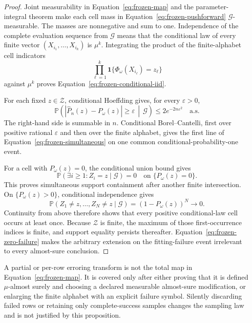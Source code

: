 \documentclass[11pt]{article}
\theoremstyle{definition}
\newcommand{\cZ}{\mathcal{Z}}
\newcommand{\Phat}{\widehat{P}}
\newcommand{\Prb}{\mathbb{P}}
\newcommand{\Ind}{\mathbf{1}}
\begin{document}
\begin{proof}
Joint measurability in Equation~\eqref{eq:frozen-map} and the parameter-integral theorem make each
cell mass in Equation~\eqref{eq:frozen-pushforward} $\mathcal G$-measurable.  The masses are
nonnegative and sum to one.  Independence of the complete evaluation sequence from $\mathcal G$
means that the conditional law of every finite vector
$(X_{i_1},\ldots,X_{i_k})$ is $\mu^k$.  Integrating the product of the finite-alphabet cell
indicators
\[
  \prod_{\ell=1}^{k}
  \Ind\{\Phi_\omega(X_{i_\ell})=z_\ell\}
\]
against $\mu^k$ proves Equation~\eqref{eq:frozen-conditional-iid}.

For each fixed $z\in\cZ$, conditional Hoeffding gives, for every $\varepsilon>0$,
\begin{equation}
  \Prb\!\left(
    |\Phat_n(z)-P_\omega(z)|\ge\varepsilon
    \,\middle|\,\mathcal G
  \right)
  \le2e^{-2n\varepsilon^2}
  \quad\text{a.s.}
\end{equation}
The right-hand side is summable in $n$.  Conditional Borel--Cantelli, first over positive rational
$\varepsilon$ and then over the finite alphabet, gives the first line of
Equation~\eqref{eq:frozen-simultaneous} on one common conditional-probability-one event.

For a cell with $P_\omega(z)=0$, the conditional union bound gives
\begin{equation}
  \Prb(\exists i\ge1:Z_i=z\mid\mathcal G)=0
  \quad\text{on }\{P_\omega(z)=0\}.
\end{equation}
This proves simultaneous support containment after another finite intersection.  On
$\{P_\omega(z)>0\}$, conditional independence gives
\begin{equation}
  \Prb(Z_1\ne z,\ldots,Z_N\ne z\mid\mathcal G)
  =(1-P_\omega(z))^N\longrightarrow0.
\end{equation}
Continuity from above therefore shows that every positive conditional-law cell occurs at least
once.  Because $\cZ$ is finite, the maximum of those first-occurrence indices is finite, and
support equality persists thereafter.  Equation~\eqref{eq:frozen-zero-failure} makes the arbitrary
extension on the fitting-failure event irrelevant to every almost-sure conclusion.
\end{proof}

A partial or per-row erroring transform is not the total map in
Equation~\eqref{eq:frozen-map}.  It is covered only after either proving that it is defined
$\mu$-almost surely and choosing a declared measurable almost-sure modification, or enlarging the
finite alphabet with an explicit failure symbol.  Silently discarding failed rows or retaining
only complete-success samples changes the sampling law and is not justified by this proposition.
\end{document}
